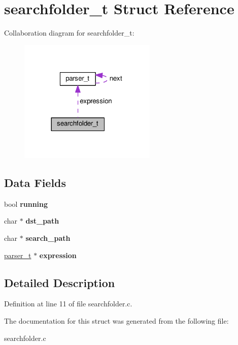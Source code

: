 \hypertarget{structsearchfolder__t}{}\section{searchfolder\+\_\+t Struct Reference}
\label{structsearchfolder__t}


Collaboration diagram for searchfolder\+\_\+t\+:\nopagebreak
\begin{figure}[H]
\begin{center}
\leavevmode
\includegraphics[width=185pt]{structsearchfolder__t__coll__graph}
\end{center}
\end{figure}
\subsection*{Data Fields}
\begin{DoxyCompactItemize}
\item 
bool {\bfseries running}\hypertarget{structsearchfolder__t_a36f7b6be7108281af77939ceaec42fd6}{}\label{structsearchfolder__t_a36f7b6be7108281af77939ceaec42fd6}

\item 
char $\ast$ {\bfseries dst\+\_\+path}\hypertarget{structsearchfolder__t_a74a7cec2bc63610109c58ef392d14e27}{}\label{structsearchfolder__t_a74a7cec2bc63610109c58ef392d14e27}

\item 
char $\ast$ {\bfseries search\+\_\+path}\hypertarget{structsearchfolder__t_a614ce96a64fa528698e05ce10070efe9}{}\label{structsearchfolder__t_a614ce96a64fa528698e05ce10070efe9}

\item 
\hyperlink{structparser__t}{parser\+\_\+t} $\ast$ {\bfseries expression}\hypertarget{structsearchfolder__t_a37eed245f4d8beb45412f8ba904643b2}{}\label{structsearchfolder__t_a37eed245f4d8beb45412f8ba904643b2}

\end{DoxyCompactItemize}


\subsection{Detailed Description}


Definition at line 11 of file searchfolder.\+c.



The documentation for this struct was generated from the following file\+:\begin{DoxyCompactItemize}
\item 
searchfolder.\+c\end{DoxyCompactItemize}
